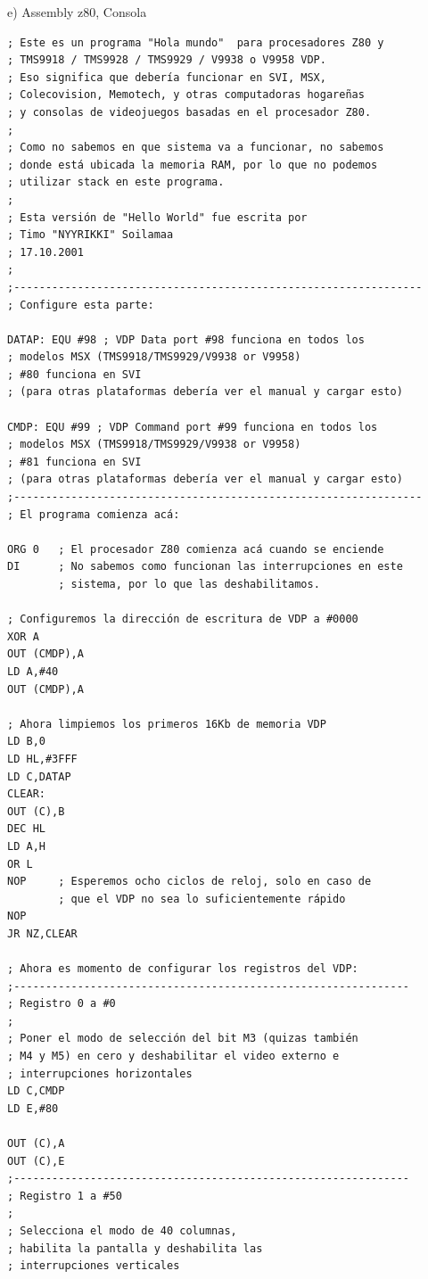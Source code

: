 \vspace{0.5cm}
\noindent e) Assembly z80, Consola
\begin{lstlisting}[language={[x86masm]Assembler},morekeywords={LD,CLEAR,DJNZ,JR,HALT,DEFB}]
; Este es un programa "Hola mundo"  para procesadores Z80 y
; TMS9918 / TMS9928 / TMS9929 / V9938 o V9958 VDP.
; Eso significa que debería funcionar en SVI, MSX,
; Colecovision, Memotech, y otras computadoras hogareñas
; y consolas de videojuegos basadas en el procesador Z80.
;
; Como no sabemos en que sistema va a funcionar, no sabemos
; donde está ubicada la memoria RAM, por lo que no podemos
; utilizar stack en este programa.
;
; Esta versión de "Hello World" fue escrita por
; Timo "NYYRIKKI" Soilamaa
; 17.10.2001
;
;----------------------------------------------------------------
; Configure esta parte:

DATAP: EQU #98 ; VDP Data port #98 funciona en todos los
; modelos MSX (TMS9918/TMS9929/V9938 or V9958)
; #80 funciona en SVI
; (para otras plataformas debería ver el manual y cargar esto)

CMDP: EQU #99 ; VDP Command port #99 funciona en todos los
; modelos MSX (TMS9918/TMS9929/V9938 or V9958)
; #81 funciona en SVI
; (para otras plataformas debería ver el manual y cargar esto)
;----------------------------------------------------------------
; El programa comienza acá:

ORG 0   ; El procesador Z80 comienza acá cuando se enciende
DI      ; No sabemos como funcionan las interrupciones en este
        ; sistema, por lo que las deshabilitamos.

; Configuremos la dirección de escritura de VDP a #0000
XOR A
OUT (CMDP),A
LD A,#40
OUT (CMDP),A

; Ahora limpiemos los primeros 16Kb de memoria VDP
LD B,0
LD HL,#3FFF
LD C,DATAP
CLEAR:
OUT (C),B
DEC HL
LD A,H
OR L
NOP     ; Esperemos ocho ciclos de reloj, solo en caso de
        ; que el VDP no sea lo suficientemente rápido
NOP
JR NZ,CLEAR

; Ahora es momento de configurar los registros del VDP:
;--------------------------------------------------------------
; Registro 0 a #0
;
; Poner el modo de selección del bit M3 (quizas también
; M4 y M5) en cero y deshabilitar el video externo e
; interrupciones horizontales
LD C,CMDP
LD E,#80

OUT (C),A
OUT (C),E
;--------------------------------------------------------------
; Registro 1 a #50
;
; Selecciona el modo de 40 columnas,
; habilita la pantalla y deshabilita las
; interrupciones verticales


\end{lstlisting}
